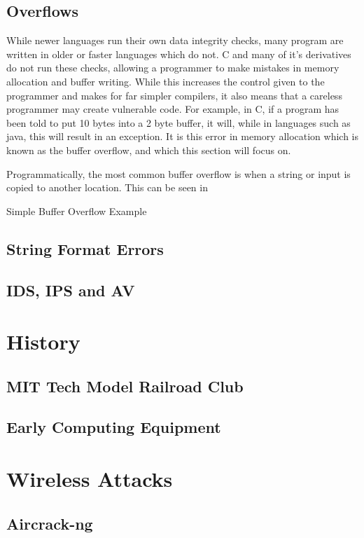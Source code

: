 \documentclass[a4paper,11pt]{report}
\begin{document}
	\section{Overflows}
		While newer languages run their own data integrity checks, many program are written in older or faster languages which do not. 
		C and many of it's derivatives do not run these checks, allowing a programmer to make mistakes in memory allocation and buffer writing. 
		While this increases the control given to the programmer and makes for far simpler compilers, it also means that a careless programmer may create vulnerable code. 
		For example, in C, if a program has been told to put 10 bytes into a 2 byte buffer, it will, while in languages such as java, this will result in an exception. 
		It is this error in memory allocation which is known as the buffer overflow, and which this section will focus on. 

		Programmatically, the most common buffer overflow is when a string or input is copied to another location. This can be seen in %
		\begin{code}
			
			\caption{Simple Buffer Overflow Example}
			\label{code:OverflowSimple}
		\end{code}
	\section{String Format Errors}
	\section{IDS, IPS and AV}
\chapter{History}
	\section{MIT Tech Model Railroad Club}
	\section{Early Computing Equipment}
\chapter{Wireless Attacks}
	\section{Aircrack-ng}
\end{document}
